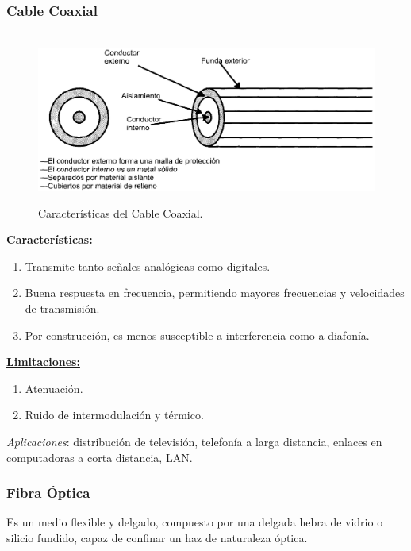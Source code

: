 \documentclass[10pt,a4paper]{article}
\begin{document}
\subsubsection{Cable Coaxial}

\begin{figure}[ht!]
  \caption{Características del Cable Coaxial.}
  \label{fig:cable_coaxial}  
  \centering
  \hbox{
	\includegraphics[width=\textwidth-\fboxrule-\fboxrule]{imgs/cable_coaxial.png}}
\end{figure}

\underline{\textbf{Características:}}
\begin{enumerate}[+]
\item Transmite tanto señales analógicas como digitales.
\item Buena respuesta en frecuencia, permitiendo mayores frecuencias y velocidades de transmisión.
\item Por construcción, es menos susceptible a interferencia como a diafonía.
\end{enumerate}

\underline{\textbf{Limitaciones:}}
\begin{enumerate}[+]
\item Atenuación.
\item Ruido de intermodulación y térmico.
\end{enumerate}

\textit{Aplicaciones}: distribución de televisión, telefonía a larga distancia, enlaces en computadoras a corta distancia, LAN.

\subsubsection{Fibra Óptica}

Es un medio flexible y delgado, compuesto por una delgada hebra de vidrio o silicio fundido, capaz de confinar un haz de naturaleza óptica.
\end{document}
